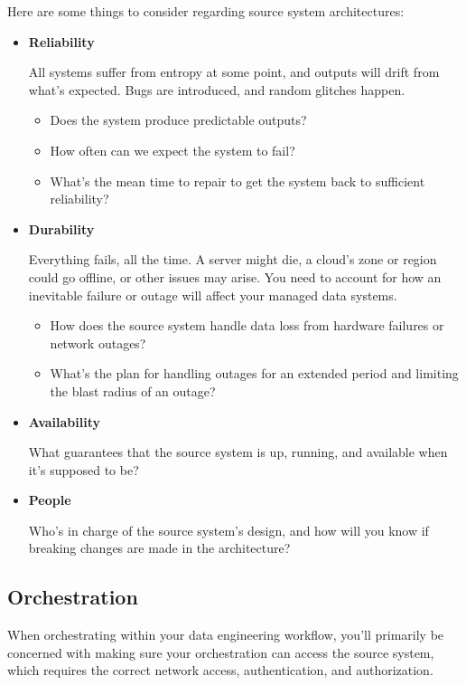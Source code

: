 Here are some things to consider regarding source system
architectures:
\begin{itemize}
    \item \textbf{Reliability}
    
    \noindent
    All systems suffer from entropy at some point, and outputs
    will drift from what's expected. Bugs are introduced, and
    random glitches happen.
    \begin{itemize}
        \item Does the system produce predictable outputs?
        \item How often can we expect the system to fail?
        \item What's the mean time to repair to get the system
        back to sufficient reliability?
    \end{itemize}
      

    \item \textbf{Durability}
    
    \noindent
    Everything fails, all the time. A server might die, a cloud's
    zone or region could go offline, or other issues may arise.
    You need to account for how an inevitable failure or outage
    will affect your managed data systems.
    \begin{itemize}
        \item How does the source system handle data loss from
        hardware failures or network outages?

        \item What's the plan for handling outages for an extended
        period and limiting the blast radius of an outage?
    \end{itemize}

    \item \textbf{Availability}
    
    \noindent
    What guarantees that the source system is up, running, and
    available when it's supposed to be?


    \item \textbf{People}
    
    \noindent
    Who's in charge of the source system's design, and how will
    you know if breaking changes are made in the architecture?


\end{itemize}


\subsection*{Orchestration}
When orchestrating within your data engineering workflow, you'll
primarily be concerned with making sure your orchestration can
access the source system, which requires the correct network
access, authentication, and authorization.

